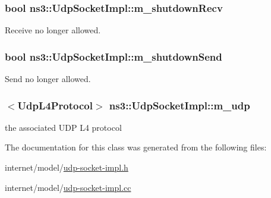 \subsubsection[{\texorpdfstring{m\+\_\+shutdown\+Recv}{m_shutdownRecv}}]{\setlength{\rightskip}{0pt plus 5cm}bool ns3\+::\+Udp\+Socket\+Impl\+::m\+\_\+shutdown\+Recv\hspace{0.3cm}{\ttfamily [private]}}\hypertarget{classns3_1_1UdpSocketImpl_abda20957e451801973534c38d9d74f4a}{}\label{classns3_1_1UdpSocketImpl_abda20957e451801973534c38d9d74f4a}


Receive no longer allowed. 

\subsubsection[{\texorpdfstring{m\+\_\+shutdown\+Send}{m_shutdownSend}}]{\setlength{\rightskip}{0pt plus 5cm}bool ns3\+::\+Udp\+Socket\+Impl\+::m\+\_\+shutdown\+Send\hspace{0.3cm}{\ttfamily [private]}}\hypertarget{classns3_1_1UdpSocketImpl_a9ff4985bbd8bdc29bbe36ba0937149fa}{}\label{classns3_1_1UdpSocketImpl_a9ff4985bbd8bdc29bbe36ba0937149fa}


Send no longer allowed. 

\subsubsection[{\texorpdfstring{m\+\_\+udp}{m_udp}}]{$<${\bf Udp\+L4\+Protocol}$>$ ns3\+::\+Udp\+Socket\+Impl\+::m\+\_\+udp\hspace{0.3cm}{\ttfamily [private]}}\hypertarget{classns3_1_1UdpSocketImpl_ace4b90c1ab6f4f302cdb4cd8da973514}{}\label{classns3_1_1UdpSocketImpl_ace4b90c1ab6f4f302cdb4cd8da973514}


the associated U\+DP L4 protocol 



The documentation for this class was generated from the following files\+:\begin{DoxyCompactItemize}
\item 
internet/model/\hyperlink{udp-socket-impl_8h}{udp-\/socket-\/impl.\+h}\item 
internet/model/\hyperlink{udp-socket-impl_8cc}{udp-\/socket-\/impl.\+cc}\end{DoxyCompactItemize}

